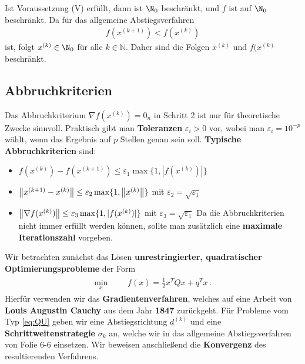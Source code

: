 Ist Voraussetzung (V) erfüllt, dann ist $\N_0$ beschränkt, und $f$ ist auf $\N_0$ beschränkt. Da für das allgemeine Abstiegsverfahren
\begin{align*}
f (x^{(k+1)}) < f(x^{(k)})
\end{align*}
ist, folgt $x^{(k)} \in \N_0$ für alle $k \in \mathbb N$. Daher sind die Folgen ${x^{(k)}}$ und
${f(x^{(k)}}$ beschränkt.
\subsection*{Abbruchkriterien}
Das Abbruchkriterium $\nabla f(x^{(k)}) = 0_n$ in Schritt 2 ist nur für theoretische Zwecke sinnvoll. Praktisch gibt man \textbf{Toleranzen} $\varepsilon_i > 0$ vor, wobei man $\varepsilon_i = 10^{-p}$ wählt, wenn das Ergebnis auf $p$ Stellen genau sein soll. \textbf{Typische Abbruchkriterien} sind:
\begin{itemize}
\item $f(x^{(k)}) - f (x^{(k+1)})  \leq \varepsilon_1 \max\lbrace 1, |f (x^{(k)})|\rbrace$
\item $ \left\lVert x^{(k+1)} - x^{(k)}\right\rVert  \leq \varepsilon_2 \max\lbrace 1, \left\lVert x^{(k)}\right\rVert\rbrace$ mit $\varepsilon_2 = \sqrt{\varepsilon_1}$
\item $\left\lVert\nabla f(x^{(k)})\right\rVert  \leq \varepsilon_3 \max\lbrace1, |f (x^{(k)})|\rbrace$ mit $\varepsilon_3 =\sqrt{\varepsilon_1}$
Da die Abbruchkriterien nicht immer erfüllt werden können, sollte man zusätzlich eine \textbf{maximale Iterationszahl} vorgeben.
\end{itemize}

Wir betrachten zunächst das Lösen \textbf{unrestringierter, quadratischer Optimierungsprobleme}
der Form
\begin{gather*} 
	\label{eq:QU}
  		\tag{QU}
  			\begin{aligned}
    			\min_x
    			& & & f(x)=\frac{1}{2}x^TQx+q^Tx \,.
  			\end{aligned}
	\end{gather*}
Hierfür verwenden wir das \textbf{Gradientenverfahren}, welches auf eine Arbeit von \textbf{Louis Augustin Cauchy} aus dem Jahr \textbf{1847} zurückgeht.
Für Probleme vom Typ \eqref{eq:QU} geben wir eine Abstiegsrichtung $d^{(k)}$ und eine \textbf{Schrittweitenstrategie} $\sigma_k$ an, welche wir in das allgemeine Abstiegsverfahren von Folie 6-6 einsetzen. Wir beweisen anschließend die \textbf{Konvergenz} des resultierenden Verfahrens.

